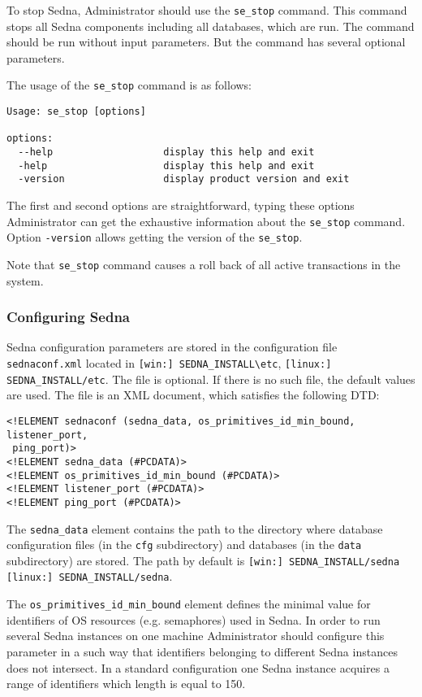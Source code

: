 \documentclass[a4paper,12pt]{article}
\begin{document}
To stop Sedna, Administrator should use the \verb!se_stop! command. This command stops all Sedna components including all databases, which are run. The command should be run without input parameters. But the command has several optional parameters.

The usage of the \verb!se_stop! command is as follows:

\begin{verbatim}
Usage: se_stop [options]

options:
  --help                   display this help and exit
  -help                    display this help and exit
  -version                 display product version and exit
\end{verbatim}
The first and second options are straightforward, typing these options Administrator can get the exhaustive information about the \verb!se_stop! command. Option \verb!-version! allows getting the version of the \verb!se_stop!.

Note that \verb!se_stop! command causes a roll back of all active transactions in the system.

\subsubsection{Configuring Sedna}
\label{sec:ConfigSedna}
Sedna configuration parameters are stored in the configuration file \verb!sednaconf.xml! located in
\verb![win:] SEDNA_INSTALL\etc!, \verb![linux:] SEDNA_INSTALL/etc!. The file is optional. If there is no such file, the default values are used.
The file is an XML document, which satisfies the following DTD:

\begin{verbatim}
<!ELEMENT sednaconf (sedna_data, os_primitives_id_min_bound, listener_port,
 ping_port)>
<!ELEMENT sedna_data (#PCDATA)>
<!ELEMENT os_primitives_id_min_bound (#PCDATA)>
<!ELEMENT listener_port (#PCDATA)>
<!ELEMENT ping_port (#PCDATA)>
\end{verbatim}

The \verb!sedna_data! element contains the path to the directory where 
database configuration files (in the \verb!cfg! subdirectory) and 
databases (in the \verb!data! subdirectory) are stored. The path by default is
\verb![win:] SEDNA_INSTALL/sedna! \verb![linux:] SEDNA_INSTALL/sedna!.

The \verb!os_primitives_id_min_bound! element defines the minimal value for identifiers of OS resources (e.g. semaphores) used in Sedna. In order to run several Sedna instances on one machine Administrator should configure this parameter in a such way that identifiers belonging to different Sedna instances does not intersect. In a standard configuration one Sedna instance acquires a range of identifiers which length is equal to 150.
\end{document}
